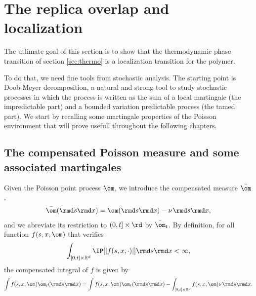 \chapter{The replica overlap and localization} \label{ch_overlap}

The utlimate goal of this section is to show that the thermodynamic phase transition of section \ref{sec:thermo} is a  localization transition for the polymer. 


To do that, we need fine tools from stochastic analysis. The starting point is Doob-Meyer decomposition, a natural and strong tool to study  stochastic processes in which the process is written as  the sum of a local martingale (the impredictable part) and a bounded variation predictable process (the tamed part).
We start by recalling some martingale properties of the Poisson environment that will prove usefull throughout the following chapters.

\section{The compensated Poisson measure and some associated martingales}
Given the Poisson point process $\om$, we introduce the compensated measure $\bar \om$,
\begin{equation}
\bar \om(\rmd s \rmd x)= \om(\rmd s \rmd x)-\nu\hspace{0.3mm} \rmd s \rmd x,
\end{equation}
and we abreviate its restriction to $(0,t]\times \rd$ by $\bar \om_t$. By definition,  for all function $f(s,x,\om)$ that verifies
\begin{equation} \label{eq:integrabiltyPoissonIntegrand}
\int_{[0,t]\times \mathbb{R}^d} \IP[|f(s,x,\cdot)|] \rmd s \rmd x < \infty,
\end{equation}
the compensated integral of $f$ is given by
\begin{equation}
\int f(s,x,\om) \bar \om_t(\rmd s \rmd x) = \int f(s,x,\om) \om_t(\rmd s \rmd x) - \int_{[0,t]\times\mathbb{R}^d} f(s,x,\om) \nu \hspace{0.3mm} \rmd s \rmd x.
\end{equation}

